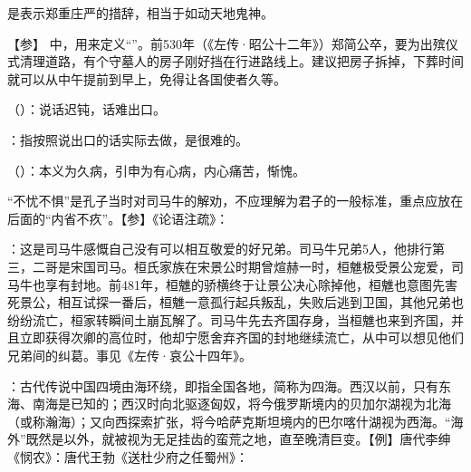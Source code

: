 {
\begin{lyitemize}
\item {}是表示郑重庄严的措辞，相当于如动天地鬼神。
\end{lyitemize}
【参】 中，用来定义“”。前530年（《左传·昭公十二年》）郑简公卒，要为出殡仪式清理道路，有个守墓人的房子刚好挡在行进路线上。建议把房子拆掉，下葬时间就可以从中午提前到早上，免得让各国使者久等。
}
{}


{
\item {}（）：说话迟钝，话难出口。
\item {}：指按照说出口的话实际去做，是很难的。
}
{}


{
\item {}（）：本义为久病，引申为有心病，内心痛苦，惭愧。

“不忧不惧”是孔子当时对司马牛的解劝，不应理解为君子的一般标准，重点应放在后面的“内省不疚”。【参】《论语注疏》： 
}
{}


{
\item {}：这是司马牛感慨自己没有可以相互敬爱的好兄弟。司马牛兄弟5人，他排行第三，二哥是宋国司马。桓氏家族在宋景公时期曾煊赫一时，桓魋极受景公宠爱，司马牛也享有封地。前481年，桓魋的骄横终于让景公决心除掉他，桓魋也意图先害死景公，相互试探一番后，桓魋一意孤行起兵叛乱，失败后逃到卫国，其他兄弟也纷纷流亡，桓家转瞬间土崩瓦解了。司马牛先去齐国存身，当桓魋也来到齐国，并且立即获得次卿的高位时，他却宁愿舍弃齐国的封地继续流亡，从中可以想见他们兄弟间的纠葛。事见《左传·哀公十四年》。

\item {}：古代传说中国四境由海环绕，即指全国各地，简称为四海。西汉以前，只有东海、南海是已知的；西汉时向北驱逐匈奴，将今俄罗斯境内的贝加尔湖视为北海（或称瀚海）；又向西探索扩张，将今哈萨克斯坦境内的巴尔喀什湖视为西海。“海外”既然是以外，就被视为无足挂齿的蛮荒之地，直至晚清巨变。【例】唐代李绅《悯农》：唐代王勃《送杜少府之任蜀州》：
}
{}


